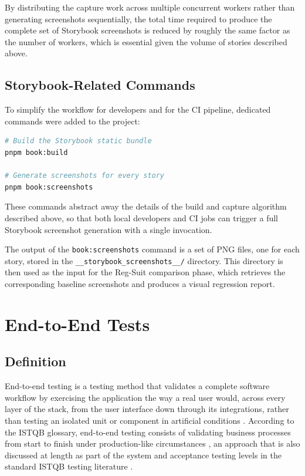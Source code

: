 By distributing the capture work across multiple concurrent workers rather than generating screenshots sequentially, the total time required to produce the complete set of Storybook screenshots is reduced by roughly the same factor as the number of workers, which is essential given the volume of stories described above.

\subsection{Storybook-Related Commands}

To simplify the workflow for developers and for the \ac{CI} pipeline, dedicated commands were added to the project:

\begin{lstlisting}[language=bash]
# Build the Storybook static bundle
pnpm book:build

# Generate screenshots for every story
pnpm book:screenshots
\end{lstlisting}

These commands abstract away the details of the build and capture algorithm described above, so that both local developers and \ac{CI} jobs can trigger a full Storybook screenshot generation with a single invocation.

The output of the \texttt{book:screenshots} command is a set of \ac{PNG} files, one for each story, stored in the \texttt{\_\_storybook\_screenshots\_\_/} directory. This directory is then used as the input for the Reg-Suit comparison phase, which retrieves the corresponding baseline screenshots and produces a visual regression report.

\section{End-to-End Tests}

\subsection{Definition}

End-to-end testing is a testing method that validates a complete software workflow by exercising the application the way a real user would, across every layer of the stack, from the user interface down through its integrations, rather than testing an isolated unit or component in artificial conditions \cite{istqb_e2e}. According to the \ac{ISTQB} glossary, end-to-end testing consists of validating business processes from start to finish under production-like circumstances \cite{istqb_e2e}, an approach that is also discussed at length as part of the system and acceptance testing levels in the standard \ac{ISTQB} testing literature \cite{black_foundations}.


